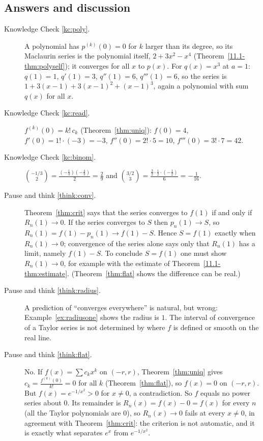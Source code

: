 \documentclass[11pt]{article}
\begin{document}
\subsection*{Answers and discussion}

\begin{description}
  \item[Knowledge Check \ref{kc:poly}.] A polynomial has $p^{(k)}(0)=0$ for $k$ larger than its degree, so its Maclaurin series is the polynomial itself, $2+3x^2-x^4$ (Theorem~\ref{11.1-thm:polyself}); it converges for all $x$ to $p(x)$. For $q(x)=x^3$ at $a=1$: $q(1)=1$, $q'(1)=3$, $q''(1)=6$, $q'''(1)=6$, so the series is $1+3(x-1)+3(x-1)^2+(x-1)^3$, again a polynomial with sum $q(x)$ for all $x$.
  \item[Knowledge Check \ref{kc:read}.] $f^{(k)}(0)=k!\,c_k$ (Theorem~\ref{thm:uniq}): $f(0)=4$, $f'(0)=1!\cdot(-3)=-3$, $f''(0)=2!\cdot5=10$, $f'''(0)=3!\cdot7=42$.
  \item[Knowledge Check \ref{kc:binom}.] $\binom{-1/3}2=\frac{(-\frac13)(-\frac43)}2=\frac29$ and $\binom{3/2}3=\frac{\frac32\cdot\frac12\cdot(-\frac12)}6=-\frac1{16}$.
  \item[Pause and think \ref{think:conv}.] Theorem~\ref{thm:crit} says that the series converges to $f(1)$ if and only if $R_n(1)\to0$. If the series converges to $S$ then $p_n(1)\to S$, so $R_n(1)=f(1)-p_n(1)\to f(1)-S$. Hence $S=f(1)$ exactly when $R_n(1)\to0$; convergence of the series alone says only that $R_n(1)$ has a limit, namely $f(1)-S$. To conclude $S=f(1)$ one must show $R_n(1)\to0$, for example with the estimate of Theorem~\ref{11.1-thm:estimate}. (Theorem~\ref{thm:flat} shows the difference can be real.)
  \item[Pause and think \ref{think:radius}.] A prediction of ``converges everywhere'' is natural, but wrong: Example~\ref{ex:radiusone} shows the radius is $1$. The interval of convergence of a Taylor series is not determined by where $f$ is defined or smooth on the real line.
  \item[Pause and think \ref{think:flat}.] No. If $f(x)=\sum c_kx^k$ on $(-r,r)$, Theorem~\ref{thm:uniq} gives $c_k=\frac{f^{(k)}(0)}{k!}=0$ for all $k$ (Theorem~\ref{thm:flat}), so $f(x)=0$ on $(-r,r)$. But $f(x)=e^{-1/x^2}>0$ for $x\ne0$, a contradiction. So $f$ equals no power series about $0$. Its remainder is $R_n(x)=f(x)-0=f(x)$ for every $n$ (all the Taylor polynomials are $0$), so $R_n(x)\to0$ fails at every $x\ne0$, in agreement with Theorem~\ref{thm:crit}: the criterion is not automatic, and it is exactly what separates $e^x$ from $e^{-1/x^2}$.
\end{description}
\end{document}
